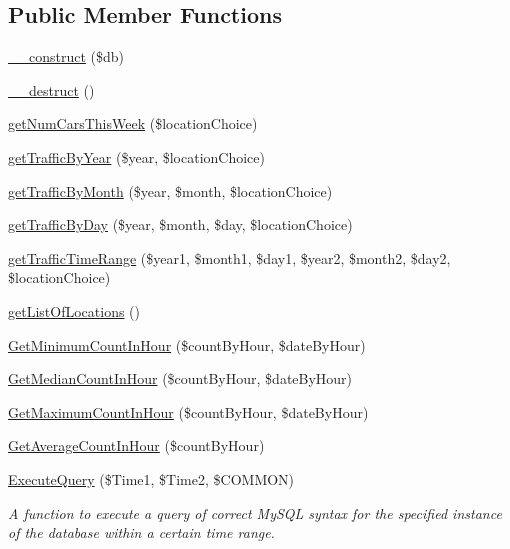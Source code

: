 \subsection*{Public Member Functions}
\begin{DoxyCompactItemize}
\item 
\hyperlink{class_p_h_pto_s_q_l_a800f8efee13692788b13ee57c5960092}{\+\_\+\+\_\+construct} (\$db)
\item 
\hyperlink{class_p_h_pto_s_q_l_a421831a265621325e1fdd19aace0c758}{\+\_\+\+\_\+destruct} ()
\item 
\hyperlink{class_p_h_pto_s_q_l_a6e6deaf037e5413c56743ab1985fc0b6}{get\+Num\+Cars\+This\+Week} (\$location\+Choice)
\item 
\hyperlink{class_p_h_pto_s_q_l_a88bd9a6c7f64a8f733270a7134204ebb}{get\+Traffic\+By\+Year} (\$year, \$location\+Choice)
\item 
\hyperlink{class_p_h_pto_s_q_l_a2389b15a72a087f39f462b1ff8f8ef95}{get\+Traffic\+By\+Month} (\$year, \$month, \$location\+Choice)
\item 
\hyperlink{class_p_h_pto_s_q_l_a6278f024da07a6ff95ffcf3efc6c0c5d}{get\+Traffic\+By\+Day} (\$year, \$month, \$day, \$location\+Choice)
\item 
\hyperlink{class_p_h_pto_s_q_l_ac91d0c56506620188f25007d30f1e8d0}{get\+Traffic\+Time\+Range} (\$year1, \$month1, \$day1, \$year2, \$month2, \$day2, \$location\+Choice)
\item 
\hyperlink{class_p_h_pto_s_q_l_a64377368eb86a5a874483663c7da1407}{get\+List\+Of\+Locations} ()
\item 
\hyperlink{class_p_h_pto_s_q_l_acc7b884d5cfc62ca661996820eebbba2}{Get\+Minimum\+Count\+In\+Hour} (\$count\+By\+Hour, \$date\+By\+Hour)
\item 
\hyperlink{class_p_h_pto_s_q_l_a59876f14f59f0b3321ae144eb0987692}{Get\+Median\+Count\+In\+Hour} (\$count\+By\+Hour, \$date\+By\+Hour)
\item 
\hyperlink{class_p_h_pto_s_q_l_ab4dfd011e2c8436c0284c99573d30d4a}{Get\+Maximum\+Count\+In\+Hour} (\$count\+By\+Hour, \$date\+By\+Hour)
\item 
\hyperlink{class_p_h_pto_s_q_l_a085d2dda8ee0aa89eba99f4b475851d1}{Get\+Average\+Count\+In\+Hour} (\$count\+By\+Hour)
\item 
\hyperlink{class_p_h_pto_s_q_l_ac5a84f4e20620ec0cfac496528ce01ec}{Execute\+Query} (\$Time1, \$Time2, \$C\+O\+M\+M\+ON)
\begin{DoxyCompactList}\small\item\em A function to execute a query of correct My\+S\+QL syntax for the specified instance of the database within a certain time range. \end{DoxyCompactList}\item 

\end{DoxyCompactItemize}
